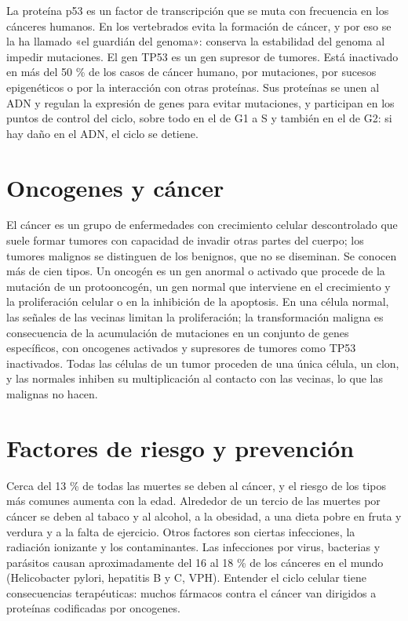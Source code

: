 \documentclass{book}
\begin{document}
La proteína p53 es un factor de transcripción que se muta con frecuencia en los cánceres humanos. En los vertebrados evita la formación de cáncer, y por eso se la ha llamado «el guardián del genoma»: conserva la estabilidad del genoma al impedir mutaciones. El gen TP53 es un gen supresor de tumores. Está inactivado en más del 50 \% de los casos de cáncer humano, por mutaciones, por sucesos epigenéticos o por la interacción con otras proteínas. Sus proteínas se unen al ADN y regulan la expresión de genes para evitar mutaciones, y participan en los puntos de control del ciclo, sobre todo en el de G1 a S y también en el de G2: si hay daño en el ADN, el ciclo se detiene.


\section{Oncogenes y cáncer}

El cáncer es un grupo de enfermedades con crecimiento celular descontrolado que suele formar tumores con capacidad de invadir otras partes del cuerpo; los tumores malignos se distinguen de los benignos, que no se diseminan. Se conocen más de cien tipos. Un oncogén es un gen anormal o activado que procede de la mutación de un protooncogén, un gen normal que interviene en el crecimiento y la proliferación celular o en la inhibición de la apoptosis. En una célula normal, las señales de las vecinas limitan la proliferación; la transformación maligna es consecuencia de la acumulación de mutaciones en un conjunto de genes específicos, con oncogenes activados y supresores de tumores como TP53 inactivados. Todas las células de un tumor proceden de una única célula, un clon, y las normales inhiben su multiplicación al contacto con las vecinas, lo que las malignas no hacen.


\section{Factores de riesgo y prevención}

Cerca del 13 \% de todas las muertes se deben al cáncer, y el riesgo de los tipos más comunes aumenta con la edad. Alrededor de un tercio de las muertes por cáncer se deben al tabaco y al alcohol, a la obesidad, a una dieta pobre en fruta y verdura y a la falta de ejercicio. Otros factores son ciertas infecciones, la radiación ionizante y los contaminantes. Las infecciones por virus, bacterias y parásitos causan aproximadamente del 16 al 18 \% de los cánceres en el mundo (Helicobacter pylori, hepatitis B y C, VPH). Entender el ciclo celular tiene consecuencias terapéuticas: muchos fármacos contra el cáncer van dirigidos a proteínas codificadas por oncogenes.
\end{document}
